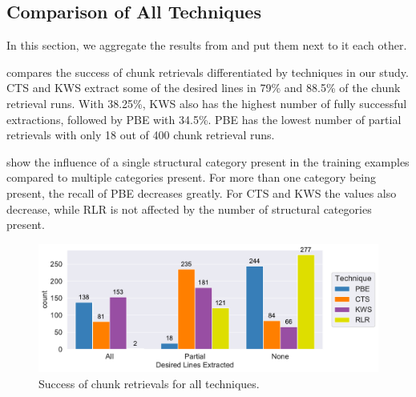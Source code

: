 \subsection{Comparison of All Techniques}
In this section, we aggregate the results from
 and put them next to it
each other.

 compares the success of chunk
retrievals differentiated by techniques in our study.
CTS and KWS
extract some of the desired lines in 79\% and 88.5\% of the chunk
retrieval runs.
With 38.25\%, KWS also has the highest number of fully
successful extractions, followed by PBE with 34.5\%.
PBE has the
lowest number of partial retrievals with only 18 out of 400 chunk
retrieval runs.


show the influence of a single structural category present in the
training examples compared to multiple categories present.
For more
than one category being present, the recall of PBE decreases greatly.
For CTS and KWS the values also decrease, while RLR is not affected by
the number of structural categories present.

\begin{figure}[!t]
		\centering
		\includegraphics[width=\columnwidth,
		clip]{img/big-study/success-partial-all.pdf}
		\caption{Success of chunk retrievals for all techniques.}
		\label{fig:success-partial-all}
\end{figure}

